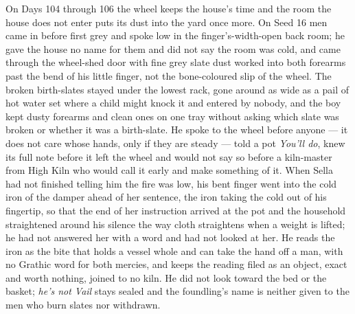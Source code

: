 \documentclass{design/chronicle}
\begin{document}
{On Days 104 through 106 the wheel keeps the house’s time and the room the house does not enter puts its dust into the yard once more. On Seed 16 men came in before first grey and spoke low in the finger’s-width-open back room; he gave the house no name for them and did not say the room was cold, and came through the wheel-shed door with fine grey slate dust worked into both forearms past the bend of his little finger, not the bone-coloured slip of the wheel. The broken birth-slates stayed under the lowest rack, gone around as wide as a pail of hot water set where a child might knock it and entered by nobody, and the boy kept dusty forearms and clean ones on one tray without asking which slate was broken or whether it was a birth-slate. He spoke to the wheel before anyone --- it does not care whose hands, only if they are steady --- told a pot \emph{You’ll do}, knew its full note before it left the wheel and would not say so before a kiln-master from High Kiln who would call it early and make something of it. When Sella had not finished telling him the fire was low, his bent finger went into the cold iron of the damper ahead of her sentence, the iron taking the cold out of his fingertip, so that the end of her instruction arrived at the pot and the household straightened around his silence the way cloth straightens when a weight is lifted; he had not answered her with a word and had not looked at her. He reads the iron as the bite that holds a vessel whole and can take the hand off a man, with no Grathic word for both mercies, and keeps the reading filed as an object, exact and worth nothing, joined to no kiln. He did not look toward the bed or the basket; \emph{he’s not Vail} stays sealed and the foundling’s name is neither given to the men who burn slates nor withdrawn.

}
\end{document}
